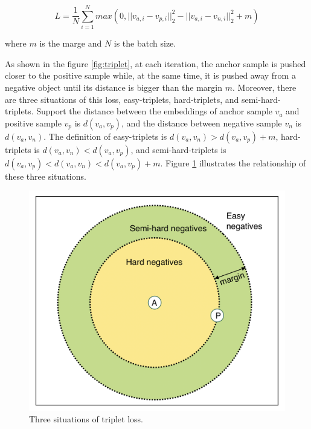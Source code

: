 \begin{equation}
L = \frac{1}{N}\sum_{i=1}^{N}max(0, || v_{a,i} - v_{p,i} ||_2^2 - || v_{a,i} - v_{n,i} ||_2^2  + m )
\label{equ:triplet}
\end{equation}

where $m$ is the marge and $N$ is the batch size. 

As shown in the figure \ref{fig:triplet}, at each iteration, the anchor sample is pushed closer to the positive sample while, at the same time, it is pushed away from a negative object until its distance is bigger than the margin $m$. Moreover, there are three situations of this loss, easy-triplets, hard-triplets, and semi-hard-triplets. Support the distance between the embeddings of anchor sample  $v_{a}$ and positive sample $v_{p}$ is $d(v_a, v_p)$, and the distance between negative sample $v_n$ is $d(v_a, v_n)$. The definition of easy-triplets is $d(v_a, v_n) > d(v_a, v_p) + m$, hard-triplets is $d(v_a, v_n) < d(v_a, v_p)$, and semi-hard-triplets is $d(v_a, v_p) < d(v_a, v_n) < d(v_a, v_p) + m$. Figure \ref{fig:sitiations} illustrates the relationship of these three situations. 

\begin{figure}[h]
  \centering
  \includegraphics[width=0.6\linewidth]{figs/sitiations.png}
  \caption{Three situations of triplet loss.}
  \label{fig:sitiations}
\end{figure}




